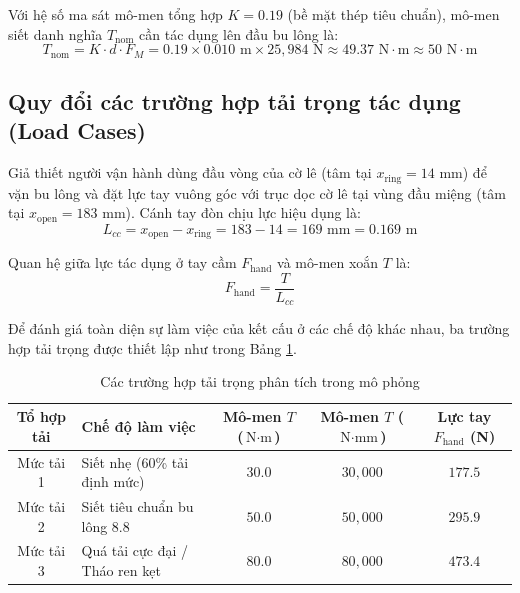\documentclass[12pt,a4paper]{article}
\begin{document}
Với hệ số ma sát mô-men tổng hợp $K = 0.19$ (bề mặt thép tiêu chuẩn), mô-men siết danh nghĩa $T_{\text{nom}}$ cần tác dụng lên đầu bu lông là:
\begin{equation}
    T_{\text{nom}} = K \cdot d \cdot F_M = 0.19 \times 0.010\text{ m} \times 25,984\text{ N} \approx 49.37\text{ N}\cdot\text{m} \approx 50\text{ N}\cdot\text{m}
\end{equation}

\subsection{Quy đổi các trường hợp tải trọng tác dụng (Load Cases)}
Giả thiết người vận hành dùng đầu vòng của cờ lê (tâm tại $x_{\text{ring}} = 14\text{ mm}$) để vặn bu lông và đặt lực tay vuông góc với trục dọc cờ lê tại vùng đầu miệng (tâm tại $x_{\text{open}} = 183\text{ mm}$). Cánh tay đòn chịu lực hiệu dụng là:
\begin{equation}
    L_{cc} = x_{\text{open}} - x_{\text{ring}} = 183 - 14 = 169\text{ mm} = 0.169\text{ m}
\end{equation}

Quan hệ giữa lực tác dụng ở tay cầm $F_{\text{hand}}$ và mô-men xoắn $T$ là:
\begin{equation}
    F_{\text{hand}} = \frac{T}{L_{cc}}
\end{equation}

Để đánh giá toàn diện sự làm việc của kết cấu ở các chế độ khác nhau, ba trường hợp tải trọng được thiết lập như trong Bảng \ref{tab:load_cases}.

\begin{table}[h!]
\centering
\caption{Các trường hợp tải trọng phân tích trong mô phỏng}
\label{tab:load_cases}
\vspace{4pt}
\begin{tabular}{@{}clccc@{}}
\toprule
\textbf{Tổ hợp tải} & \textbf{Chế độ làm việc} & \textbf{Mô-men $T$ ($\text{N}\cdot\text{m}$)} & \textbf{Mô-men $T$ ($\text{N}\cdot\text{mm}$)} & \textbf{Lực tay $F_{\text{hand}}$ (N)} \\ \midrule
Mức tải 1 & Siết nhẹ (60\% tải định mức) & $30.0$ & $30,000$ & $177.5$ \\
Mức tải 2 & Siết tiêu chuẩn bu lông 8.8 & $50.0$ & $50,000$ & $295.9$ \\
Mức tải 3 & Quá tải cực đại / Tháo ren kẹt & $80.0$ & $80,000$ & $473.4$ \\ \bottomrule
\end{tabular}
\end{table}
\end{document}
